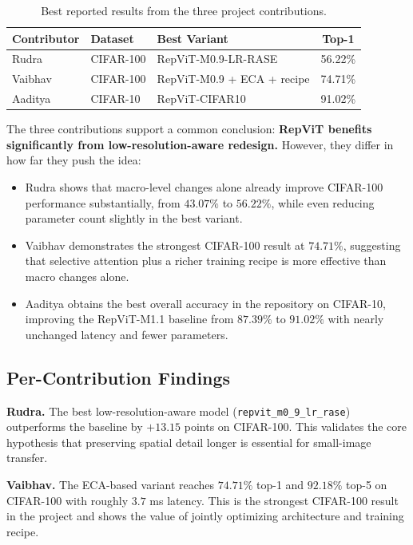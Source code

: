 \documentclass[10pt,a4paper,twocolumn]{article}
\begin{document}
\begin{table}[h]
\centering
\caption{Best reported results from the three project contributions.}
\label{tab:summary}
\begin{tabular}{>{\raggedright\arraybackslash}p{2.0cm} >{\raggedright\arraybackslash}p{1.3cm} >{\raggedright\arraybackslash}p{2.5cm} c}
\toprule
Contributor & Dataset & Best Variant & Top-1 \\
\midrule
Rudra & CIFAR-100 & RepViT-M0.9-LR-RASE & 56.22\% \\
Vaibhav & CIFAR-100 & RepViT-M0.9 + ECA + recipe & 74.71\% \\
Aaditya & CIFAR-10 & RepViT-CIFAR10 & 91.02\% \\
\bottomrule
\end{tabular}
\end{table}

The three contributions support a common conclusion: \textbf{RepViT benefits significantly from low-resolution-aware redesign.} However, they differ in how far they push the idea:
\begin{itemize}[leftmargin=1.2em]
    \item Rudra shows that macro-level changes alone already improve CIFAR-100 performance substantially, from \(43.07\%\) to \(56.22\%\), while even reducing parameter count slightly in the best variant.
    \item Vaibhav demonstrates the strongest CIFAR-100 result at \(74.71\%\), suggesting that selective attention plus a richer training recipe is more effective than macro changes alone.
    \item Aaditya obtains the best overall accuracy in the repository on CIFAR-10, improving the RepViT-M1.1 baseline from \(87.39\%\) to \(91.02\%\) with nearly unchanged latency and fewer parameters.
\end{itemize}

\subsection*{Per-Contribution Findings}

\textbf{Rudra.} The best low-resolution-aware model (\texttt{repvit\_m0\_9\_lr\_rase}) outperforms the baseline by \(+13.15\) points on CIFAR-100. This validates the core hypothesis that preserving spatial detail longer is essential for small-image transfer.

\textbf{Vaibhav.} The ECA-based variant reaches \(74.71\%\) top-1 and \(92.18\%\) top-5 on CIFAR-100 with roughly \(3.7\) ms latency. This is the strongest CIFAR-100 result in the project and shows the value of jointly optimizing architecture and training recipe.
\end{document}
